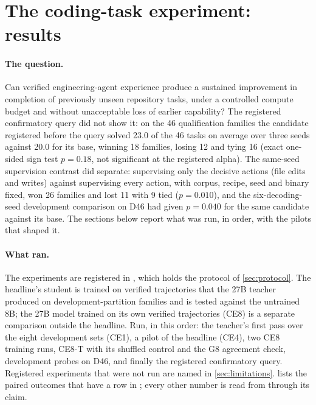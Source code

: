 
\section{The coding-task experiment: results}\label{sec:coding-results}

\paragraph{The question.} Can verified engineering-agent experience produce a sustained
improvement in completion of previously unseen repository tasks, under a controlled compute budget
and without unacceptable loss of earlier capability? The registered confirmatory query
did not show it: on the 46 qualification families the candidate registered before the query
solved 23.0 of the 46 tasks on average over three seeds against 20.0 for its base, winning 18 families, losing 12 and tying
16 (exact one-sided sign test $p=0.18$, not significant at the registered alpha). The same-seed
supervision contrast did separate: supervising only the decisive actions (file edits and writes)
against supervising every action, with corpus, recipe, seed and binary fixed, won 26 families and
lost 11 with 9 tied ($p=0.010$), and the six-decoding-seed development comparison on D46 had
given $p=0.040$ for the same candidate against its base. The sections below report
what was run, in order, with the pilots that shaped it.

\paragraph{What ran.} The experiments are registered in , which holds
the protocol of \cref{sec:protocol}. The headline's student is trained on verified trajectories
that the 27B teacher produced on development-partition families and is tested against the untrained
8B; the 27B model trained on its own verified trajectories (CE8) is a separate comparison
outside the headline. Run, in this order: the teacher's first pass over the eight
development sets (CE1), a pilot of the headline (CE4), two CE8 training runs, CE8-T with its
shuffled control and the G8 agreement check, development probes on D46, and finally the registered
confirmatory query. Registered experiments that were not run are named in \cref{sec:limitations}.
 lists the paired outcomes that have a row in ; every other
number is read from  through its claim.

